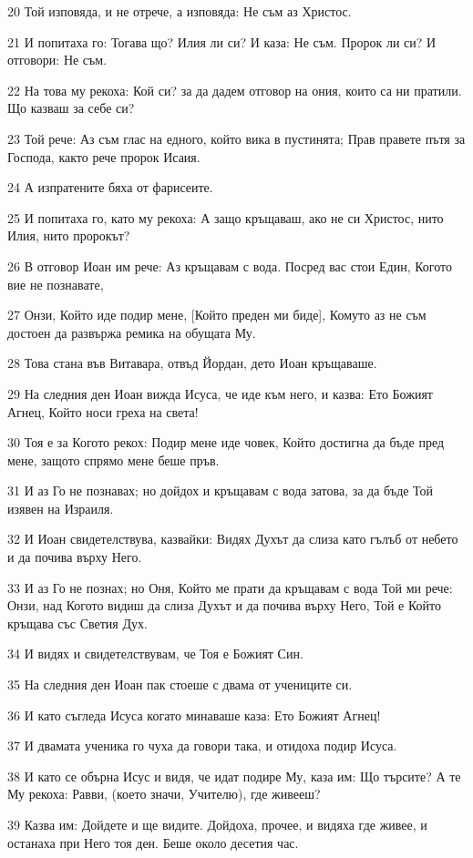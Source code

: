 \par 20 Той изповяда, и не отрече, а изповяда: Не съм аз Христос.
\par 21 И попитаха го: Тогава що? Илия ли си? И каза: Не съм. Пророк ли си? И отговори: Не съм.
\par 22 На това му рекоха: Кой си? за да дадем отговор на ония, които са ни пратили. Що казваш за себе си?
\par 23 Той рече: Аз съм глас на едного, който вика в пустинята; Прав правете пътя за Господа, както рече пророк Исаия.
\par 24 А изпратените бяха от фарисеите.
\par 25 И попитаха го, като му рекоха: А защо кръщаваш, ако не си Христос, нито Илия, нито пророкът?
\par 26 В отговор Иоан им рече: Аз кръщавам с вода. Посред вас стои Един, Когото вие не познавате,
\par 27 Онзи, Който иде подир мене, [Който преден ми биде], Комуто аз не съм достоен да развържа ремика на обущата Му.
\par 28 Това стана във Витавара, отвъд Йордан, дето Иоан кръщаваше.
\par 29 На следния ден Иоан вижда Исуса, че иде към него, и казва: Ето Божият Агнец, Който носи греха на света!
\par 30 Тоя е за Когото рекох: Подир мене иде човек, Който достигна да бъде пред мене, защото спрямо мене беше пръв.
\par 31 И аз Го не познавах; но дойдох и кръщавам с вода затова, за да бъде Той изявен на Израиля.
\par 32 И Иоан свидетелствува, казвайки: Видях Духът да слиза като гълъб от небето и да почива върху Него.
\par 33 И аз Го не познах; но Оня, Който ме прати да кръщавам с вода Той ми рече: Онзи, над Когото видиш да слиза Духът и да почива върху Него, Той е Който кръщава със Светия Дух.
\par 34 И видях и свидетелствувам, че Тоя е Божият Син.
\par 35 На следния ден Иоан пак стоеше с двама от учениците си.
\par 36 И като съгледа Исуса когато минаваше каза: Ето Божият Агнец!
\par 37 И двамата ученика го чуха да говори така, и отидоха подир Исуса.
\par 38 И като се обърна Исус и видя, че идат подире Му, каза им: Що търсите? А те Му рекоха: Равви, (което значи, Учителю), где живееш?
\par 39 Казва им: Дойдете и ще видите. Дойдоха, прочее, и видяха где живее, и останаха при Него тоя ден. Беше около десетия час.

